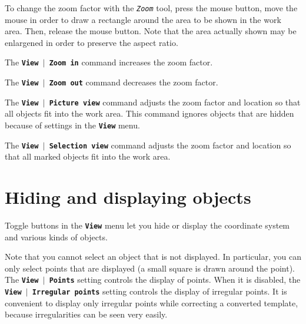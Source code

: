 \documentclass[12pt]{report}
\begin{document}
To change the zoom factor with the \textit{\texttt{Zoom}} tool, press
the mouse button, move the mouse in order to draw a rectangle around
the area to be shown in the work area. Then, release the mouse button.
Note that the area actually shown may be enlargened in order to
preserve the aspect ratio.

The \textbf{\texttt{View \begin{math}\vert{}\end{math} Zoom in}} command
increases the zoom factor.

The \textbf{\texttt{View \begin{math}\vert{}\end{math} Zoom out}}
command decreases the zoom factor.

The \textbf{\texttt{View \begin{math}\vert{}\end{math} Picture view}}
command adjusts the zoom factor and location so that all objects fit
into the work area. This command ignores objects that are hidden
because of settings in the \textbf{\texttt{View}} menu.

The \textbf{\texttt{View \begin{math}\vert{}\end{math} Selection view}}
command adjusts the zoom factor and location so that all marked objects
fit into the work area.

\section{Hiding and displaying objects}

Toggle buttons in the \textbf{\texttt{View}} menu let you hide or
display the coordinate system and various kinds of objects.

Note that you cannot select an object that is not displayed. In
particular, you can only select points that are displayed (a small
square is drawn around the point). The
\textbf{\texttt{View \begin{math}\vert{}\end{math} Points}} setting
controls the display of points. When it is disabled, the
\textbf{\texttt{View \begin{math}\vert{}\end{math} Irregular points}}
setting controls the display of irregular points. It is convenient to
display only irregular points while correcting a converted template,
because irregularities can be seen very easily.
\end{document}
